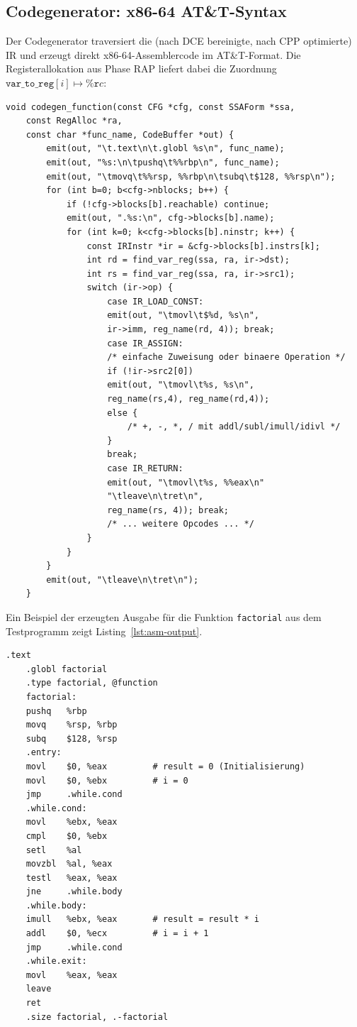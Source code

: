 ﻿\documentclass[a4paper,12pt]{article}
\theoremstyle{definition}
\begin{document}
\subsection{Codegenerator: x86-64 AT\&T-Syntax}
\label{sec:impl-codegen}

Der Codegenerator traversiert die (nach DCE bereinigte, nach CPP
optimierte) IR und erzeugt direkt x86-64-Assemblercode im AT\&T-Format.
Die Registerallokation aus Phase RAP liefert dabei die Zuordnung
$\texttt{var\_to\_reg}[i] \mapsto \mathtt{\%r}c$:

\begin{lstlisting}[style=cstyle, caption={Codegenerierung -- IR zu x86-64
		(compiler\_full.c)}, label=lst:codegen]
	void codegen_function(const CFG *cfg, const SSAForm *ssa,
	const RegAlloc *ra,
	const char *func_name, CodeBuffer *out) {
		emit(out, "\t.text\n\t.globl %s\n", func_name);
		emit(out, "%s:\n\tpushq\t%%rbp\n", func_name);
		emit(out, "\tmovq\t%%rsp, %%rbp\n\tsubq\t$128, %%rsp\n");
		for (int b=0; b<cfg->nblocks; b++) {
			if (!cfg->blocks[b].reachable) continue;
			emit(out, ".%s:\n", cfg->blocks[b].name);
			for (int k=0; k<cfg->blocks[b].ninstr; k++) {
				const IRInstr *ir = &cfg->blocks[b].instrs[k];
				int rd = find_var_reg(ssa, ra, ir->dst);
				int rs = find_var_reg(ssa, ra, ir->src1);
				switch (ir->op) {
					case IR_LOAD_CONST:
					emit(out, "\tmovl\t$%d, %s\n",
					ir->imm, reg_name(rd, 4)); break;
					case IR_ASSIGN:
					/* einfache Zuweisung oder binaere Operation */
					if (!ir->src2[0])
					emit(out, "\tmovl\t%s, %s\n",
					reg_name(rs,4), reg_name(rd,4));
					else {
						/* +, -, *, / mit addl/subl/imull/idivl */
					}
					break;
					case IR_RETURN:
					emit(out, "\tmovl\t%s, %%eax\n"
					"\tleave\n\tret\n",
					reg_name(rs, 4)); break;
					/* ... weitere Opcodes ... */
				}
			}
		}
		emit(out, "\tleave\n\tret\n");
	}
\end{lstlisting}

Ein Beispiel der erzeugten Ausgabe für die Funktion \texttt{factorial}
aus dem Testprogramm zeigt Listing~\ref{lst:asm-output}.

\begin{lstlisting}[language={[x86masm]Assembler},
	caption={Erzeugter x86-64-Assemblercode für \texttt{factorial}},
	label=lst:asm-output]
	.text
	.globl factorial
	.type factorial, @function
	factorial:
	pushq   %rbp
	movq    %rsp, %rbp
	subq    $128, %rsp
	.entry:
	movl    $0, %eax         # result = 0 (Initialisierung)
	movl    $0, %ebx         # i = 0
	jmp     .while.cond
	.while.cond:
	movl    %ebx, %eax
	cmpl    $0, %ebx
	setl    %al
	movzbl  %al, %eax
	testl   %eax, %eax
	jne     .while.body
	.while.body:
	imull   %ebx, %eax       # result = result * i
	addl    $0, %ecx         # i = i + 1
	jmp     .while.cond
	.while.exit:
	movl    %eax, %eax
	leave
	ret
	.size factorial, .-factorial
\end{lstlisting}
\end{document}
